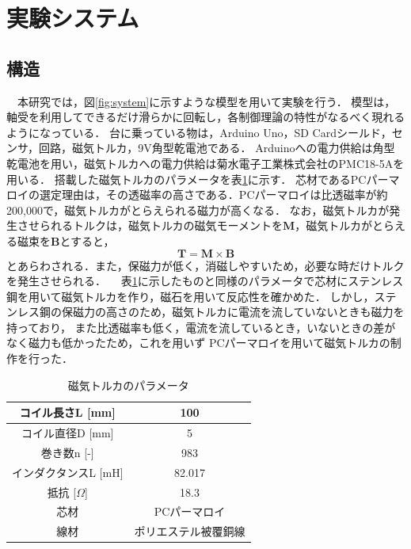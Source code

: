 \section{実験システム}
\subsection{構造}
　本研究では，図\ref{fig:system}に示すような模型を用いて実験を行う．
模型は，軸受を利用してできるだけ滑らかに回転し，各制御理論の特性がなるべく現れるようになっている．
台に乗っている物は，Arduino Uno，SD Cardシールド，センサ，回路，磁気トルカ，9V角型乾電池である．
Arduinoへの電力供給は角型乾電池を用い，磁気トルカへの電力供給は菊水電子工業株式会社のPMC18-5Aを用いる．
搭載した磁気トルカのパラメータを表\ref{table:torquer}に示す．
芯材であるPCパーマロイの選定理由は，その透磁率の高さである．PCパーマロイは比透磁率が約200,000で，磁気トルカがとらえられる磁力が高くなる．
なお，磁気トルカが発生させられるトルクは，磁気トルカの磁気モーメントを$\boldsymbol{M}$，磁気トルカがとらえる磁束を$\boldsymbol{B}$とすると，
\begin{equation}
	\boldsymbol{T = M \times B}
\end{equation}
とあらわされる．また，保磁力が低く，消磁しやすいため，必要な時だけトルクを発生させられる．
　表\ref{table:torquer}に示したものと同様のパラメータで芯材にステンレス鋼を用いて磁気トルカを作り，磁石を用いて反応性を確かめた．
しかし，ステンレス鋼の保磁力の高さのため，磁気トルカに電流を流していないときも磁力を持っており，
また比透磁率も低く，電流を流しているとき，いないときの差がなく磁力も低かったため，これを用いず
PCパーマロイを用いて磁気トルカの制作を行った．

\begin{table}[H]
	\centering
	\caption{磁気トルカのパラメータ}
	\label{table:torquer}
	\begin{tabular}{|c||c|}
		\hline
		コイル長さL [mm] & 100\\ \hline
		コイル直径D [mm] & 5\\ \hline
		巻き数n [-] & 983 \\ \hline
		インダクタンスL [mH] & 	82.017 \\ \hline
		抵抗 [$\Omega $] & 18.3 \\ \hline
		芯材 & PCパーマロイ \\ \hline
		線材 & ポリエステル被覆銅線 \\ \hline    
	\end{tabular}
\end{table}

